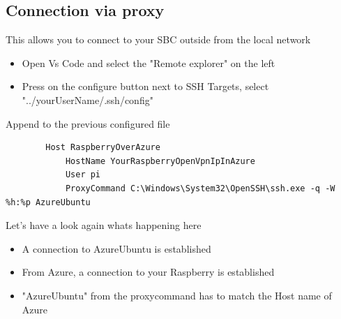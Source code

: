 \documentclass[a4paper,12pt]{article}
\begin{document}
	\subsection{Connection via proxy}
	This allows you to connect to your SBC outside from the local network
	\begin{itemize}
		\item Open Vs Code and select the "Remote explorer" on the left
		\item Press on the configure button next to SSH Targets, select "../yourUserName/.ssh/config"
	\end{itemize}
	Append to the previous configured file
	\begin{verbatim}
		Host RaspberryOverAzure
			HostName YourRaspberryOpenVpnIpInAzure
			User pi
			ProxyCommand C:\Windows\System32\OpenSSH\ssh.exe -q -W %h:%p AzureUbuntu
	\end{verbatim}
	Let's have a look again whats happening here
	\begin{itemize}
		\item A connection to AzureUbuntu is established
		\item From Azure, a connection to your Raspberry is established
		\item "AzureUbuntu" from the proxycommand has to match the Host name of Azure
	\end{itemize}
\end{document}

